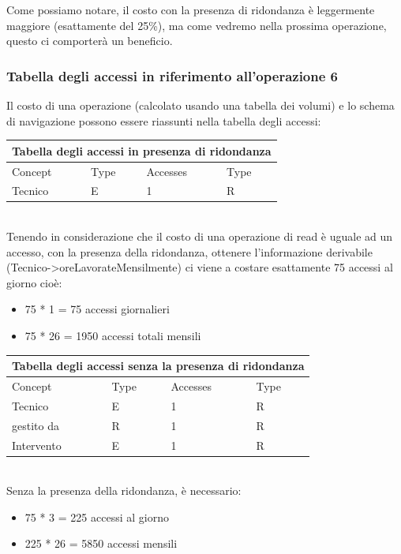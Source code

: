 \documentclass[legalpaper]{article}
\begin{document}
	Come possiamo notare, il costo con la presenza di ridondanza è leggermente maggiore (esattamente del 25\%), ma come vedremo nella prossima operazione, questo ci comporterà un beneficio.
	
	\subsubsection{Tabella degli accessi in riferimento all'operazione 6}
	Il costo di una operazione (calcolato usando una tabella dei volumi) e lo schema di navigazione possono essere riassunti nella tabella degli accessi: \\ 
	\newline
	\medskip
	\renewcommand\arraystretch{1,5}
	\begin{tabular}{|p{4cm}|p{4cm}|p{4cm}|p{4cm}|}
		\hline
		\multicolumn{4}{|c|}{\textbf{Tabella degli accessi in presenza di ridondanza}}\\
		\hline
		Concept & Type & Accesses & Type \\
		\hline
		Tecnico & E & 1 & R \\
		\hline
	\end{tabular}\\
	\newline
	Tenendo in considerazione che il costo di una operazione di read è uguale ad un accesso, con la presenza della ridondanza, ottenere l'informazione derivabile (Tecnico->oreLavorateMensilmente) ci viene a costare esattamente 75 accessi al giorno cioè:
	\begin{itemize}
		\item 75 * 1 = 75 accessi giornalieri
		\item 75 * 26 = 1950 accessi totali mensili
	\end{itemize}
	\begin{tabular}{|p{4cm}|p{4cm}|p{4cm}|p{4cm}|}
		\hline
		\multicolumn{4}{|c|}{\textbf{Tabella degli accessi senza la presenza di ridondanza}}\\
		\hline
		Concept & Type & Accesses & Type \\
		\hline
		Tecnico & E & 1 & R \\
		\hline
		gestito da & R & 1 & R \\ 
		\hline
		Intervento & E & 1 & R \\
		\hline
	\end{tabular} \\
	\newline
	Senza la presenza della ridondanza, è necessario:
	\begin{itemize}
		\item 75 * 3 = 225 accessi al giorno
		\item 225 * 26 = 5850 accessi mensili
	\end{itemize}
\end{document}
